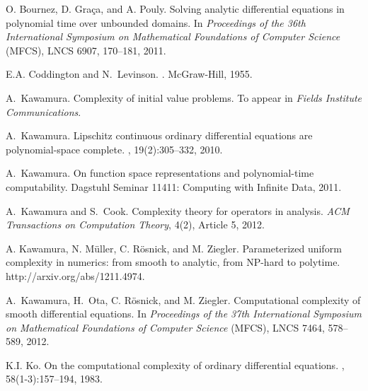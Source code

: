 \documentclass{lmcs}
\theoremstyle{definition}
\theoremstyle{remark}
\begin{document}
\begin{thebibliography}{10}

O. Bournez, D. Gra{\c c}a, and A. Pouly.
\newblock Solving analytic differential equations in polynomial time over unbounded domains.
\newblock In {\em Proceedings of the 36th International Symposium on Mathematical Foundations of Computer Science} (MFCS), 
LNCS 6907, 170--181, 2011.

E.A. Coddington and N.~Levinson.
.
\newblock McGraw-Hill, 1955.

A.~Kawamura.
\newblock Complexity of initial value problems.
\newblock To appear in {\em Fields Institute Communications}.

A.~Kawamura.
\newblock Lipschitz continuous ordinary differential equations are
  polynomial-space complete.
, 19(2):305--332, 2010.

A.~Kawamura.
\newblock On function space representations and polynomial-time computability.
\newblock Dagstuhl Seminar 11411: Computing with Infinite Data, 2011.

A.~Kawamura and S.~Cook.
\newblock Complexity theory for operators in analysis.
\newblock \emph{ACM Transactions on Computation Theory}, 4(2), Article 5, 2012.

A. Kawamura, N. M{\"u}ller, C. R{\"o}snick, and M. Ziegler.
\newblock Parameterized uniform complexity in numerics: from smooth to analytic, from NP-hard to polytime. 
\newblock http://arxiv.org/abs/1211.4974. 

A.~Kawamura, H.~Ota, C. R{\"o}snick, and M. Ziegler.
\newblock Computational complexity of smooth differential equations. 
\newblock In \emph{Proceedings of the 37th International Symposium on Mathematical Foundations of Computer Science} (MFCS), 
LNCS 7464, 578--589, 2012. 

K.I. Ko.
\newblock On the computational complexity of ordinary differential equations.
, 58(1-3):157--194, 1983.


\end{thebibliography}
\end{document}
